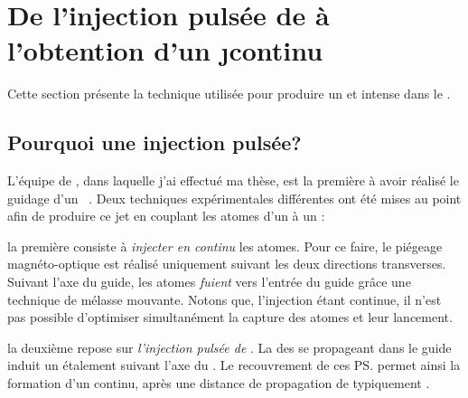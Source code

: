 


\section{De l'injection pulsée de \pats à l'obtention d'un \j continu}\label{sec:FormationJetContinu}
Cette section présente la technique utilisée pour produire un \jatuf et intense dans le \gm. 

	\subsection{Pourquoi une injection pulsée?}
L'équipe de \dgo, dans laquelle j'ai effectué ma thèse, est la première à avoir réalisé le guidage d'un \jaf~\cite{CRA02}. Deux techniques expérimentales différentes ont été mises au point afin de produire ce jet en couplant les atomes d'un \pmo à un \gm:
\begin{itemizel}
	\item la première consiste à \emph{injecter en continu} les atomes. Pour ce faire, le piégeage magnéto-optique est réalisé uniquement suivant les deux directions transverses. Suivant l'axe du guide, les atomes \emph{fuient} vers l'entrée du guide grâce une technique de mélasse mouvante. Notons que, l'injection étant continue, il n'est pas possible d'optimiser simultanément la capture des atomes et leur lancement. 
	\item la deuxième repose sur \emph{l'injection pulsée de \pats}. La \dispvitlong des \pats se propageant dans le guide induit un étalement suivant l'axe du \gm. Le recouvrement de ces \ps permet ainsi la formation d'un \jat continu, après une distance de propagation de typiquement .
\end{itemizel} 


